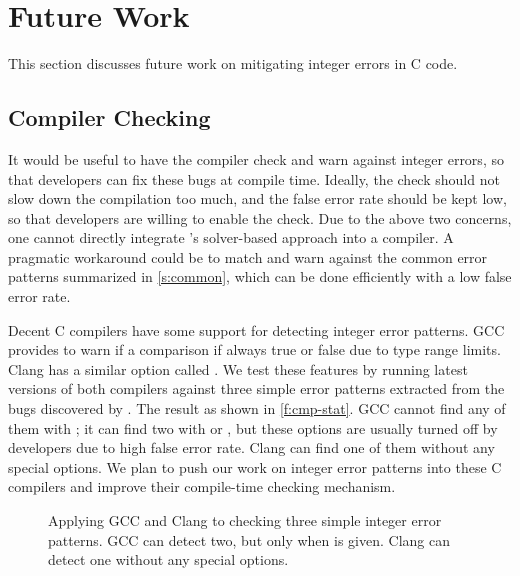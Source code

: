 \section{Future Work}
\label{s:miti}

This section discusses future work on mitigating integer errors
in C code.

\subsection{Compiler Checking}

It would be useful to have the compiler check and warn against
integer errors, so that developers can fix these bugs
at compile time.  Ideally, the check should not slow down
the compilation too much, and the false error rate should be kept low,
so that developers are willing to enable the check.
%
Due to the above two concerns, one cannot directly integrate
\sys's solver-based approach into a compiler.  A pragmatic workaround
could be to match and warn against the common error patterns
summarized in \autoref{s:common}, which can be done efficiently
with a low false error rate.

Decent C compilers have some support for detecting integer error
patterns.
%
GCC provides  to warn if a comparison if always
true or false due to type range limits.
%
Clang has a similar option called .
%
We test these features by running latest versions of both compilers
against three simple error patterns extracted from the bugs discovered
by \sys.  The result as shown in \autoref{f:cmp-stat}.  GCC cannot
find any of them with ; it can find two with 
or , but these options are usually turned off by
developers due to high false error rate.  Clang can find one of them
without any special options.
%
%
We plan to push our work on integer error patterns into these C
compilers and improve their compile-time checking mechanism.

\begin{figure}
\centering

\caption{Applying GCC and Clang to checking three simple integer
error patterns.  GCC can detect two, but only when  is
given.  Clang can detect one without any special options.}
\label{f:cmp-stat}
\end{figure}

